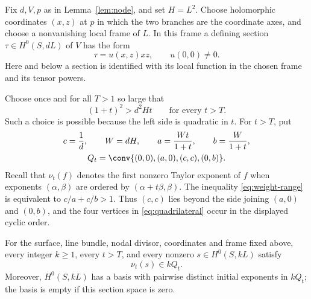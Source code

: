Fix $d,V,p$ as in Lemma~\ref{lem:node}, and set $H=L^2$.
Choose holomorphic coordinates $(x,z)$ at $p$ in which the two branches
are the coordinate axes, and choose a nonvanishing local frame of $L$.
In this frame a defining section $\tau\in H^0(S,dL)$ of $V$ has the form
\begin{equation}
 \tau=u(x,z)xz,\qquad u(0,0)\ne0.
 \label{eq:node-unit}
\end{equation}
Here and below a section is identified with its local function in the
chosen frame and its tensor powers.

Choose once and for all $T>1$ so large that
\begin{equation}
 (1+t)^2>d^2Ht\qquad\text{for every }t>T.
 \label{eq:weight-range}
\end{equation}
Such a choice is possible because the left side is quadratic in $t$.
For $t>T$, put
\begin{equation}
 \begin{gathered}
 c=\frac1d,\qquad W=dH,\qquad
 a=\frac{Wt}{1+t},\qquad b=\frac{W}{1+t},\\
 Q_t=\conv\{(0,0),(a,0),(c,c),(0,b)\}.
 \end{gathered}
 \label{eq:quadrilateral}
\end{equation}
Recall that $\nu_t(f)$ denotes the first nonzero Taylor exponent of $f$
when exponents $(\alpha,\beta)$ are ordered by
$(\alpha+t\beta,\beta)$.  The inequality \eqref{eq:weight-range} is
equivalent to $c/a+c/b>1$.  Thus $(c,c)$ lies beyond the side joining
$(a,0)$ and $(0,b)$, and the four vertices in
\eqref{eq:quadrilateral} occur in the displayed cyclic order.

\begin{proposition}
\label{prop:quadrilateral}
For the surface, line bundle, nodal divisor, coordinates and frame fixed
above, every integer $k\ge1$, every $t>T$, and every nonzero
$s\in H^0(S,kL)$ satisfy
\[
 \nu_t(s)\in kQ_t.
\]
Moreover, $H^0(S,kL)$ has a basis with pairwise distinct initial exponents
in $kQ_t$; the basis is empty if this section space is zero.
\end{proposition}

